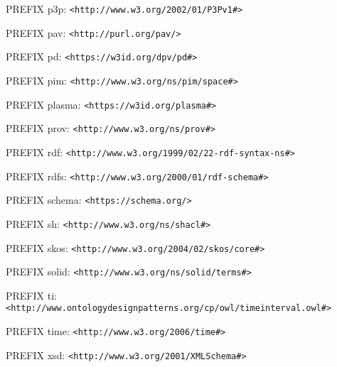 PREFIX p3p: \texttt{<http://www.w3.org/2002/01/P3Pv1\#>}

PREFIX pav: \texttt{<http://purl.org/pav/>}

PREFIX pd: \texttt{<https://w3id.org/dpv/pd\#>}

PREFIX pim: \texttt{<http://www.w3.org/ns/pim/space\#>}

PREFIX plasma: \texttt{<https://w3id.org/plasma\#>}

PREFIX prov: \texttt{<http://www.w3.org/ns/prov\#>}

PREFIX rdf: \texttt{<http://www.w3.org/1999/02/22-rdf-syntax-ns\#>}

PREFIX rdfs: \texttt{<http://www.w3.org/2000/01/rdf-schema\#>}

PREFIX schema: \texttt{<https://schema.org/>}

PREFIX sh: \texttt{<http://www.w3.org/ns/shacl\#>}

PREFIX skos: \texttt{<http://www.w3.org/2004/02/skos/core\#>}

PREFIX solid: \texttt{<http://www.w3.org/ns/solid/terms\#>}

PREFIX ti: \texttt{<http://www.ontologydesignpatterns.org/cp/owl/timeinterval.owl\#>}

PREFIX time: \texttt{<http://www.w3.org/2006/time\#>}

PREFIX xsd: \texttt{<http://www.w3.org/2001/XMLSchema\#>}